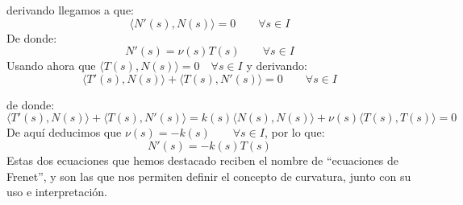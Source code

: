derivando llegamos a que:
\begin{equation*}
    \langle N'(s),N(s) \rangle  = 0 \qquad \forall s\in I
\end{equation*}
De donde:
\begin{equation*}
    N'(s) = \nu(s)T(s) \qquad \forall s\in I
\end{equation*}
Usando ahora que $\langle T(s),N(s) \rangle = 0 \quad \forall s\in I$ y derivando:
\begin{equation*}
    \langle T'(s),N(s) \rangle  + \langle T(s),N'(s) \rangle  = 0 \qquad \forall s\in I
\end{equation*}

de donde:
\begin{equation*}
    \langle T'(s),N(s) \rangle  + \langle T(s),N'(s) \rangle  = k(s)\langle N(s),N(s) \rangle + \nu(s) \langle T(s),T(s) \rangle  = 0 
\end{equation*}
De aquí deducimos que $\nu(s) = -k(s) \qquad \forall s\in I$, por lo que:
\begin{equation*}
    \boxed{N'(s) = -k(s)T(s)}
\end{equation*}
Estas dos ecuaciones que hemos destacado reciben el nombre de ``ecuaciones de Frenet'', y son las que nos permiten definir el concepto de curvatura, junto con su uso e interpretación. 

